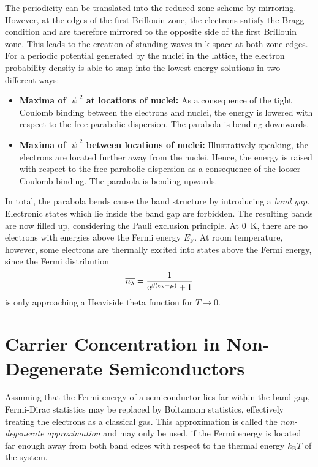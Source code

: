 The periodicity can be translated into the reduced zone scheme by mirroring.
However, at the edges of the first Brillouin zone, the electrons satisfy the Bragg condition and are therefore mirrored to the opposite side of the first Brillouin zone.
This leads to the creation of standing waves in k-space at both zone edges.
For a periodic potential generated by the nuclei in the lattice, the electron probability density is able to snap into the lowest energy solutions in two different ways:
\begin{itemize}
\item \textbf{Maxima of $|\psi|^2$ at locations of nuclei:} As a consequence of the tight Coulomb binding between the electrons and nuclei, the energy is lowered with respect to the free parabolic dispersion. The parabola is bending downwards.
	\item \textbf{Maxima of $|\psi|^2$ between locations of nuclei:} Illustratively speaking, the electrons are located further away from the nuclei. Hence, the energy is raised with respect to the free parabolic dispersion as a consequence of the looser Coulomb binding. The parabola is bending upwards.
\end{itemize}

In total, the parabola bends cause the band structure by introducing a \textit{band gap}.
Electronic states which lie inside the band gap are forbidden.
The resulting bands are now filled up, considering the Pauli exclusion principle.
At \SI{0}{\kelvin}, there are no electrons with energies above the Fermi energy $E_\text{F}$.
At room temperature, however, some electrons are thermally excited into states above the Fermi energy, since the Fermi distribution
\begin{equation*}
  \overline{n_\lambda} = \frac{1}{\mathrm{e}^{\beta\left(\epsilon_\lambda-\mu\right)} + 1}
\end{equation*}
is only approaching a Heaviside theta function for $T\rightarrow 0$.

\section{Carrier Concentration in Non-Degenerate Semiconductors}\label{sec:cc}
Assuming that the Fermi energy of a semiconductor lies far within the band gap, Fermi-Dirac statistics may be replaced by Boltzmann statistics, effectively treating the electrons as a classical gas.
This approximation is called the \textit{non-degenerate approximation} and may only be used, if the Fermi energy is located far enough away from both band edges with respect to the thermal energy $k_\text{B}T$ of the system.

